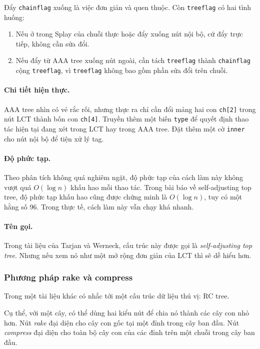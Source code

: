 \documentclass[11pt]{article}
\begin{document}
Đẩy \texttt{chainflag} xuống là việc đơn giản và quen thuộc. Còn
\texttt{treeflag} có hai tình huống:
\begin{enumerate}
  \item Nếu ở trong Splay của chuỗi thực hoặc đẩy xuống nút nội bộ, cứ đẩy trực
  tiếp, không cần sửa đổi.
  \item Nếu đẩy từ AAA tree xuống nút ngoài, cần tách \texttt{treeflag} thành
  \texttt{chainflag} cộng \texttt{treeflag}, vì \texttt{treeflag} không bao gồm
  phần sửa đổi trên chuỗi.
\end{enumerate}

\paragraph{Chi tiết hiện thực.}
AAA tree nhìn có vẻ rắc rối, nhưng thực ra chỉ cần đổi mảng hai con
\texttt{ch[2]} trong nút LCT thành bốn con \texttt{ch[4]}. Truyền thêm một biến
\texttt{type} để quyết định thao tác hiện tại đang xét trong LCT hay trong AAA
tree. Đặt thêm một cờ \texttt{inner} cho nút nội bộ để tiện xử lý tag.

\paragraph{Độ phức tạp.}
Theo phân tích không quá nghiêm ngặt, độ phức tạp của cách làm này không vượt quá
\(O(\log n)\) khấu hao mỗi thao tác. Trong bài báo về self-adjusting top tree,
độ phức tạp khấu hao cũng được chứng minh là \(O(\log n)\), tuy có một hằng số
96. Trong thực tế, cách làm này vẫn chạy khá nhanh.

\paragraph{Tên gọi.}
Trong tài liệu của Tarjan và Werneck, cấu trúc này được gọi là
\emph{self-adjusting top tree}. Nhưng nếu xem nó như một mở rộng đơn giản của
LCT thì sẽ dễ hiểu hơn.

\subsubsection{Phương pháp rake và compress}

Trong một tài liệu khác có nhắc tới một cấu trúc dữ liệu thú vị: RC tree.

Cụ thể, với một cây, có thể dùng hai kiểu nút để chia nó thành các cây con nhỏ
hơn. Nút \emph{rake} đại diện cho cây con gốc tại một đỉnh trong cây ban đầu.
Nút \emph{compress} đại diện cho toàn bộ cây con của các đỉnh trên một chuỗi
trong cây ban đầu.
\end{document}
